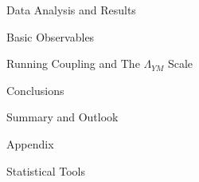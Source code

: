 \documentclass[twoside,english, a4paper, 11pt]{shared/uiofysmaster}
\begin{document}
\begin{part}{Data Analysis and Results}
	\label{part:results}
	\begin{chapter}{Basic Observables}
  		\label{chap:obs_results}
  		
	\end{chapter}

	\begin{chapter}{Running Coupling and The $\Lambda_{YM}$ Scale}
		\label{chap:advance_results}
		
  	\end{chapter}
\end{part}
 
\begin{part}{Conclusions}
	\label{part:conclusion}
	\begin{chapter}{Summary and Outlook}
		\label{chap:conclusion}
		
	\end{chapter}	
\end{part}

\cleardoublepage





\begin{appendices}
	
	\begin{part}{Appendix}
		\begin{chapter}{Statistical Tools}
			\label{appendix:resampling}
			
		\end{chapter}
	\end{part}
\end{appendices}
	
%
\printbibliography

 
 
\end{document}

